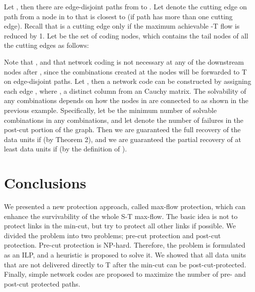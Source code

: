 \documentclass[conference]{IEEEtran}
\begin{document}
Let , then there are  edge-disjoint paths  from  to . Let  denote the cutting edge on path  from a node in  to  that is closest to  (if path  has more than one cutting edge). Recall that  is a cutting edge only if the maximum achievable -T flow is reduced by 1. Let  be the set of coding nodes, which contains the tail nodes of all the  cutting edges as follows:



Note that , and that network coding is not necessary at any of the downstream nodes after , since the combinations created at the nodes  will be forwarded to T on  edge-disjoint paths. Let , then a network code can be constructed by assigning each edge , where , a distinct column from an   Cauchy matrix. The solvability of any  combinations depends on how the nodes in  are connected to  as shown in the previous example. Specifically, let  be the minimum number of solvable combinations in any  combinations, and let  denote the number of failures in the post-cut portion of the graph. Then we are guaranteed the full recovery of the  data units if  (by Theorem 2), and we are guaranteed the partial recovery of at least  data units if  (by the definition of ).

\section{Conclusions}
\label{Sec:conc}
We presented a new protection approach, called max-flow protection, which can enhance the survivability of the whole S-T max-flow. The basic idea is not to protect links in the min-cut, but try to protect all other links if possible. We divided the problem into two problems; pre-cut protection and post-cut protection. Pre-cut protection is NP-hard. Therefore, the problem is formulated as an ILP, and a heuristic is proposed to solve it. We showed that all data units that are not delivered directly to T after the min-cut can be post-cut-protected. Finally, simple network codes are proposed to maximize the number of pre- and post-cut protected paths.
  






































 


\end{document}
